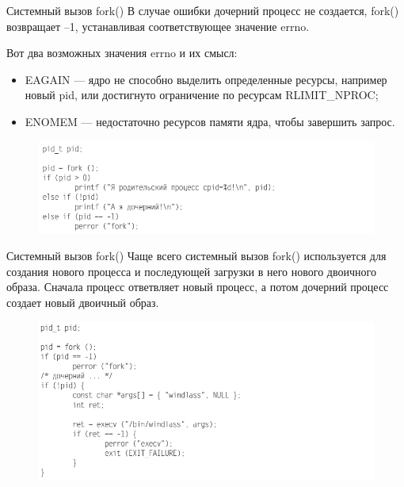 \documentclass{beamer}
\begin{document}
\begin{frame}{Системный вызов fork()}
В случае ошибки дочерний процесс не создается, fork() возвращает –1, устанавливая соответствующее значение errno. 

Вот два возможных значения errno и их
смысл:
\begin{itemize}
\item EAGAIN — ядро не способно выделить определенные ресурсы, например новый
pid, или достигнуто ограничение по ресурсам RLIMIT\_NPROC;
\item ENOMEM — недостаточно ресурсов памяти ядра, чтобы завершить запрос.
\end{itemize}
\begin{figure}[h]
\centering
\includegraphics[scale=0.5]{images/lec07-pic08.png}
\end{figure}
\end{frame}

\begin{frame}{Системный вызов fork()}
Чаще всего системный вызов fork() используется для создания нового процесса
и последующей загрузки в него нового двоичного образа.  Сначала процесс ответвляет новый процесс, а потом дочерний процесс создает новый двоичный образ.
\begin{figure}[h]
\centering
\includegraphics[scale=0.5]{images/lec07-pic09.png}
\end{figure}
\end{frame}
\end{document}

